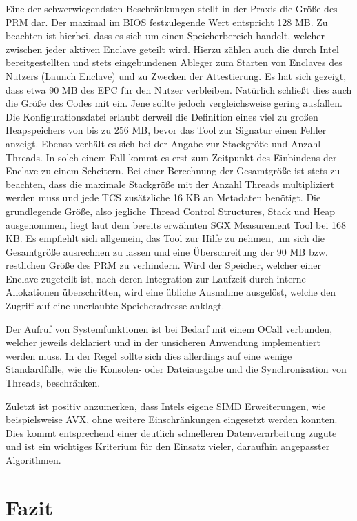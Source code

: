 Eine der schwerwiegendsten Beschränkungen stellt in der Praxis die Größe des \ac{PRM} dar. Der maximal im \ac{BIOS} festzulegende Wert entspricht 128 MB. Zu beachten ist hierbei, dass es sich um einen Speicherbereich handelt, welcher zwischen jeder aktiven Enclave geteilt wird. Hierzu zählen auch die durch Intel bereitgestellten und stets eingebundenen Ableger zum Starten von Enclaves des Nutzers (Launch Enclave) und zu Zwecken der Attestierung. Es hat sich gezeigt, dass etwa 90 MB des \ac{EPC} für den Nutzer verbleiben. Natürlich schließt dies auch die Größe des Codes mit ein. Jene sollte jedoch vergleichsweise gering ausfallen. Die Konfigurationsdatei erlaubt derweil die Definition eines viel zu großen Heapspeichers von bis zu 256 MB, bevor das Tool zur Signatur einen Fehler anzeigt. Ebenso verhält es sich bei der Angabe zur Stackgröße und Anzahl Threads. In solch einem Fall kommt es erst zum Zeitpunkt des Einbindens der Enclave zu einem Scheitern. Bei einer Berechnung der Gesamtgröße ist stets zu beachten, dass die maximale Stackgröße mit der Anzahl Threads multipliziert werden muss und jede \ac{TCS} zusätzliche 16 KB an Metadaten benötigt. Die grundlegende Größe, also jegliche Thread Control Structures, Stack und Heap ausgenommen, liegt laut dem bereits erwähnten \ac{SGX} Measurement Tool bei 168 KB. Es empfiehlt sich allgemein, das Tool zur Hilfe zu nehmen, um sich die Gesamtgröße ausrechnen zu lassen und eine Überschreitung der 90 MB bzw. restlichen Größe des \ac{PRM} zu verhindern. Wird der Speicher, welcher einer Enclave zugeteilt ist, nach deren Integration zur Laufzeit durch interne Allokationen überschritten, wird eine übliche Ausnahme ausgelöst, welche den Zugriff auf eine unerlaubte Speicheradresse anklagt.

Der Aufruf von Systemfunktionen ist bei Bedarf mit einem \ac{OCall} verbunden, welcher jeweils deklariert und in der unsicheren Anwendung implementiert werden muss. In der Regel sollte sich dies allerdings auf eine wenige Standardfälle, wie die Konsolen- oder Dateiausgabe und die Synchronisation von Threads, beschränken.

Zuletzt ist positiv anzumerken, dass Intels eigene \ac{SIMD} Erweiterungen, wie beispielsweise \ac{AVX}, ohne weitere Einschränkungen eingesetzt werden konnten. Dies kommt entsprechend einer deutlich schnelleren Datenverarbeitung zugute und ist ein wichtiges Kriterium für den Einsatz vieler, daraufhin angepasster Algorithmen.

\section{Fazit}

